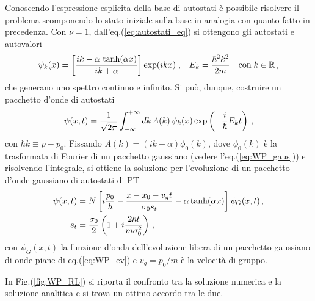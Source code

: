 \documentclass[12pt]{report}
\begin{document}
Conoscendo l'espressione esplicita della base di autostati è possibile risolvere il problema scomponendo lo stato iniziale sulla base in analogia con quanto fatto in precedenza.
Con $\nu = 1$, dall'eq.(\ref{eq:autostati_eq}) si ottengono gli autostati e autovalori
\begin{equation}
    \centering
    \psi_{k}(x) = \left[ \frac{i k - \alpha \, \tanh (\alpha x)}{ik + \alpha}\right] \exp(ikx)  \; \text{,} \quad E_k = \frac{\hbar^2 k^2}{2 m } \quad \text{con} \; k \in \mathbb{R} \, \text{,}
\end{equation}
che generano uno spettro continuo e infinito. Si può, dunque, costruire un pacchetto d'onde di autostati 
\begin{equation}
    \centering
    \psi(x, t) = \frac{1}{\sqrt{2 \pi}} \int_{-\infty}^{+\infty} dk \, A(k) \, \psi_{k}(x) \exp \left(- \frac{i}{\hbar} E_k t \right) \, \text{,}
    \label{eq:WP_RL_def}
\end{equation}
con $\hbar k \equiv p - p_0$.
Fissando $A(k) = (ik + \alpha) \phi_0(k)$, dove $\phi_0(k)$ è la trasformata di Fourier di un pacchetto gaussiano (vedere l'eq.(\ref{eq:WP_gaus})) e risolvendo l'integrale, si ottiene la soluzione per l'evoluzione di un pacchetto d'onde gaussiano di autostati di PT  
\begin{align}
    \centering
    \psi(x, t) &= N \left[i \frac{p_0}{\hbar} - \frac{x - x_0 - v_{g}t}{ \sigma_0 s_t} - \alpha \tanh (\alpha x) \right] \psi_{G}(x,t)    \, \text{,} \\
    s_t &= \frac{\sigma_0}{2} \left(1 + i \frac{2 \hbar t}{ m \sigma_0^2} \right) \, \text{,} 
    \label{eq:WP_RL_ev}
\end{align}
con $\psi_{G}(x,t)$ la funzione d'onda dell'evoluzione libera di un pacchetto gaussiano di onde piane di eq.(\ref{eq:WP_ev}) e $v_g = p_0 / m$ è la velocità di gruppo\cite{Mousavi:PT_WP}.

In Fig.(\ref{fig:WP_RL}) si riporta il confronto tra la soluzione numerica e la soluzione analitica e si trova un ottimo accordo tra le due.
\end{document}
